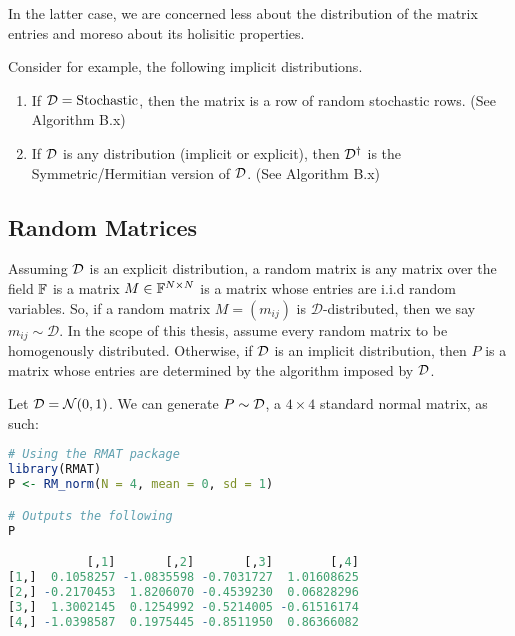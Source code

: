 In the latter case, we are concerned less about the distribution of the matrix entries and moreso about its holisitic properties.

Consider for example, the following implicit distributions.

\begin{enumerate}
\item If $\mathcal{D} = \text{Stochastic}$, then the matrix is a row of random stochastic rows. (See Algorithm B.x)
\item If $\mathcal{D}$ is any distribution (implicit or explicit), then $\mathcal{D}^{\dagger}$ is the Symmetric/Hermitian version of $\mathcal{D}$. (See Algorithm B.x)
\end{enumerate}

\subsection{Random Matrices}

\begin{definition}
Assuming $\mathcal{D}$ is an explicit distribution, a random matrix is any matrix over the field $\mathbb{F}$ is a matrix $M \in \mathbb{F}^{N \times N}$ is a matrix whose entries are i.i.d random variables. So, if a random matrix $M = (m_{ij})$ is $\mathcal{D}$-distributed, then we say $m_{ij} \sim \mathcal{D}$. In the scope of this thesis, assume every random matrix to be homogenously distributed. Otherwise, if $\mathcal{D}$ is an implicit distribution, then $P$ is a matrix whose entries are determined by the algorithm imposed by $\mathcal{D}$.
\end{definition}

\begin{code}
Let $\mathcal{D} = \mathcal{N}(0,1)$. We can generate $P \sim \mathcal{D}$, a $4 \times 4$ standard normal matrix, as such:
\end{code}

\begin{lstlisting}[language=R]
# Using the RMAT package
library(RMAT)
P <- RM_norm(N = 4, mean = 0, sd = 1)

# Outputs the following
P

           [,1]       [,2]       [,3]        [,4]
[1,]  0.1058257 -1.0835598 -0.7031727  1.01608625
[2,] -0.2170453  1.8206070 -0.4539230  0.06828296
[3,]  1.3002145  0.1254992 -0.5214005 -0.61516174
[4,] -1.0398587  0.1975445 -0.8511950  0.86366082
\end{lstlisting}

\newpage

